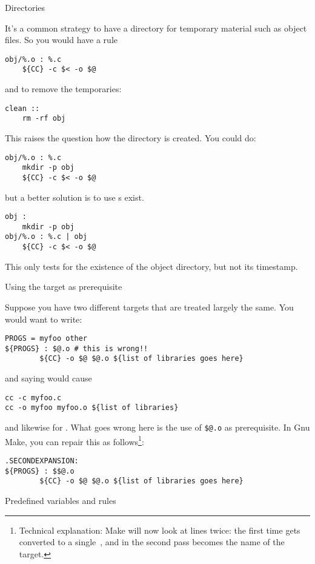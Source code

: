 {Directories}

It's a common strategy to have a directory for temporary material
such as object files. So you would have a rule
\begin{lstlisting}
obj/%.o : %.c
    ${CC} -c $< -o $@
\end{lstlisting}
and to remove the temporaries:
\begin{lstlisting}
clean ::
    rm -rf obj
\end{lstlisting}
This raises the question how the  directory is created.
You could do:
\begin{lstlisting}
obj/%.o : %.c
    mkdir -p obj
    ${CC} -c $< -o $@
\end{lstlisting}
but a better solution is to use
s exist.
\begin{lstlisting}
obj :
    mkdir -p obj
obj/%.o : %.c | obj
    ${CC} -c $< -o $@
\end{lstlisting}
This only tests for the existence of the object directory,
but not its timestamp.

 {Using the target as prerequisite}

Suppose you have two different targets that are treated largely the
same. You would want to write:
\begin{lstlisting}
PROGS = myfoo other
${PROGS} : $@.o # this is wrong!!
        ${CC} -o $@ $@.o ${list of libraries goes here}
\end{lstlisting}
and saying  would cause 
\begin{lstlisting}
cc -c myfoo.c
cc -o myfoo myfoo.o ${list of libraries}
\end{lstlisting}
and likewise for . What goes wrong here is the use of
\verb+$@.o+ as prerequisite. In Gnu Make, you can repair this as
follows\footnote{Technical explanation: Make will now look at lines
  twice: the first time \n{\$\$} gets converted to a single~\n{\$},
  and in the second pass  becomes the name of the target.}:
\begin{lstlisting}
.SECONDEXPANSION:
${PROGS} : $$@.o
        ${CC} -o $@ $@.o ${list of libraries goes here}
\end{lstlisting}


 {Predefined variables and rules}

